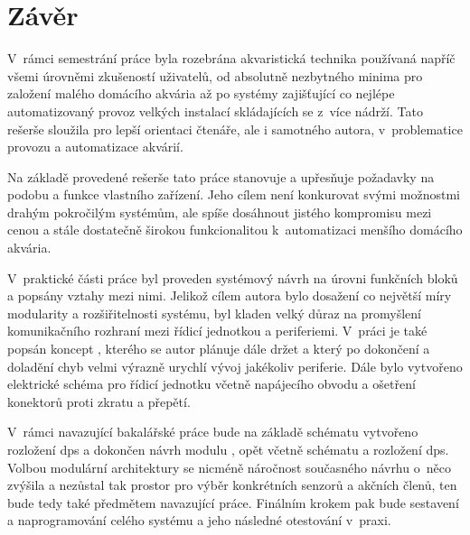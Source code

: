 \chapter*{Závěr}
{}

V~rámci semestrání práce byla rozebrána akvaristická technika používaná napříč všemi úrovněmi zkušeností uživatelů, od absolutně nezbytného minima pro založení malého domácího akvária až po systémy zajišťující co nejlépe automatizovaný provoz velkých instalací skládajících se z~více nádrží. Tato rešerše sloužila pro lepší orientaci čtenáře, ale i samotného autora, v~problematice provozu a automatizace akvárií. 

Na základě provedené rešerše tato práce stanovuje a upřesňuje požadavky na podobu a funkce vlastního zařízení. Jeho cílem není konkurovat svými možnostmi drahým pokročilým systémům, ale spíše dosáhnout jistého kompromisu mezi cenou a stále dostatečně širokou funkcionalitou k~automatizaci menšího domácího akvária.

V~praktické části práce byl proveden systémový návrh na úrovni funkčních bloků a popsány vztahy mezi nimi. Jelikož cílem autora bylo dosažení co největší míry modularity a rozšiřitelnosti systému, byl kladen velký důraz na promyšlení komunikačního rozhraní mezi řídicí jednotkou a periferiemi. V~práci je také popsán koncept , kterého se autor plánuje dále držet a který po dokončení a doladění chyb velmi výrazně urychlí vývoj jakékoliv periferie. Dále bylo vytvořeno elektrické schéma pro řídicí jednotku včetně napájecího obvodu a ošetření konektorů proti zkratu a přepětí. 

V~rámci navazující bakalářské práce bude na základě schématu vytvořeno rozložení \acs{dps} a dokončen návrh modulu , opět včetně schématu a rozložení \acs{dps}. Volbou modulární architektury se nicméně náročnost současného návrhu o~něco zvýšila a nezůstal tak prostor pro výběr konkrétních senzorů a akčních členů, ten bude tedy také předmětem navazující práce. Finálním krokem pak bude sestavení a naprogramování celého systému a jeho následné otestování v~praxi.
